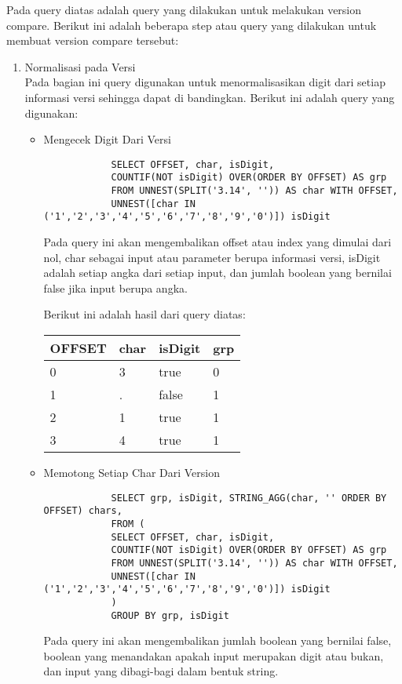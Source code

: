 Pada query diatas adalah query yang dilakukan untuk melakukan version compare. Berikut ini adalah beberapa step atau query yang dilakukan untuk membuat version compare tersebut:
\begin{enumerate}
	\item Normalisasi pada Versi\\
	Pada bagian ini query digunakan untuk menormalisasikan digit dari setiap informasi versi sehingga dapat di bandingkan. Berikut ini adalah query yang digunakan:
	\begin{itemize}
		\item  Mengecek Digit Dari Versi
		\begin{lstlisting}
			SELECT OFFSET, char, isDigit,
			COUNTIF(NOT isDigit) OVER(ORDER BY OFFSET) AS grp
			FROM UNNEST(SPLIT('3.14', '')) AS char WITH OFFSET, 
			UNNEST([char IN ('1','2','3','4','5','6','7','8','9','0')]) isDigit
		\end{lstlisting}
		Pada query ini akan mengembalikan offset atau index yang dimulai dari nol, char sebagai input atau parameter berupa informasi versi, isDigit adalah setiap angka dari setiap input, dan jumlah boolean yang bernilai false jika input berupa angka. 
		
		Berikut ini adalah hasil dari query diatas:
		\begin{table}[H]
			\centering
			\begin{tabular}{|l|l|l|l|}
				\hline
				\textbf{OFFSET} & \textbf{char} & \textbf{isDigit} & \textbf{grp}\\
				\hline
				0 & 3 & true & 0\\
				\hline
				1 & . & false & 1\\
				\hline
				2 & 1 & true & 1\\
				\hline
				3 & 4 & true & 1\\
				\hline
			\end{tabular}
			\label{table:compare_version_step_1}
		\end{table}
		
		\item Memotong Setiap Char Dari Version
		\begin{lstlisting}
			SELECT grp, isDigit, STRING_AGG(char, '' ORDER BY OFFSET) chars,
			FROM (
			SELECT OFFSET, char, isDigit,
			COUNTIF(NOT isDigit) OVER(ORDER BY OFFSET) AS grp
			FROM UNNEST(SPLIT('3.14', '')) AS char WITH OFFSET, 
			UNNEST([char IN ('1','2','3','4','5','6','7','8','9','0')]) isDigit
			)
			GROUP BY grp, isDigit
		\end{lstlisting}
		Pada query ini akan mengembalikan jumlah boolean yang bernilai false, boolean yang menandakan apakah input merupakan digit atau bukan, dan input yang dibagi-bagi dalam bentuk string.
		

\end{itemize}
\end{enumerate}
